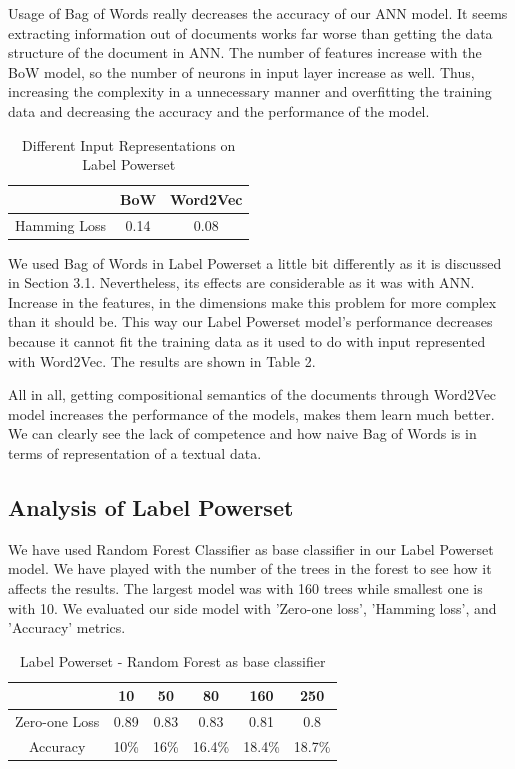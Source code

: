 \documentclass[10pt,twocolumn,letterpaper]{article}
\begin{document}
Usage of Bag of Words really decreases the accuracy of our ANN model. It seems extracting information out of documents works far worse than getting the data structure of the document in ANN. The number of features increase with the BoW model, so the number of neurons in input layer increase as well. Thus, increasing the complexity in a unnecessary manner and overfitting the training data and decreasing the accuracy and the performance of the model. 

\begin{table}[H]
\begin{center}
\begin{tabular}{|c|c|c|}
\hline
& BoW & Word2Vec \\
\hline
Hamming Loss & 0.14 & 0.08 \\
\hline
\end{tabular}
\end{center}
\caption{Different Input Representations on Label Powerset}
\end{table} 

We used Bag of Words in Label Powerset a little bit differently as it is discussed in Section 3.1. Nevertheless, its effects are considerable as it was with ANN. Increase in the features, in the dimensions make this problem for more complex than it should be. This way our Label Powerset model's performance decreases because it cannot fit the training data as it used to do with input represented with Word2Vec. The results are shown in Table 2.

All in all, getting compositional semantics of the documents through Word2Vec model increases the performance of the models, makes them learn much better. We can clearly see the lack of competence and how naive Bag of Words is in terms of representation of a textual data. 

\subsection{Analysis of Label Powerset}

We have used Random Forest Classifier as base classifier in our Label Powerset model. We have played with the number of the trees in the forest to see how it affects the results. The largest model was with 160 trees while smallest one is with 10. We evaluated our side model with 'Zero-one loss', 'Hamming loss', and 'Accuracy' metrics.

\begin{table}[H]
\begin{center}
\begin{tabular}{|c|c|c|c|c|c|}
\hline
 & 10 & 50 & 80 & 160 & 250 \\
\hline\hline
Zero-one Loss & 0.89 & 0.83 & 0.83 & 0.81 & 0.8\\ 
Accuracy & 10\% & 16\% & 16.4\% & 18.4\% & 18.7\%\\
\hline
\end{tabular}
\end{center}
\caption{Label Powerset - Random Forest as base classifier}
\end{table}
\end{document}
